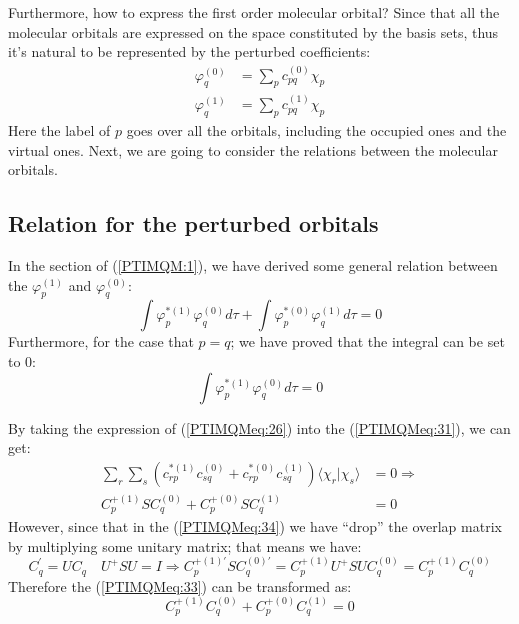 Furthermore, how to express the first order molecular orbital? Since
that all the molecular orbitals are expressed on the space
constituted by the basis sets, thus it's natural to be represented
by the perturbed coefficients:
\begin{align}\label{PTIMQMeq:26}
\varphi^{(0)}_{q} &= \sum_{p}c^{(0)}_{pq}\chi_{p} \nonumber \\
\varphi^{(1)}_{q} &= \sum_{p}c^{(1)}_{pq}\chi_{p}
\end{align}
Here the label of $p$ goes over all the orbitals, including the
occupied ones and the virtual ones. Next, we are going to consider
the relations between the molecular orbitals.



\subsection{Relation for the perturbed orbitals}
%
%
%
In the section of (\ref{PTIMQM:1}), we have derived some general
relation between the $\varphi^{(1)}_{p}$ and $\varphi^{(0)}_{q}$:
\begin{equation}\label{PTIMQMeq:31}
\int\varphi^{*(1)}_{p}\varphi^{(0)}_{q}d\tau
+\int\varphi^{*(0)}_{p}\varphi^{(1)}_{q}d\tau = 0
\end{equation}
Furthermore, for the case that $p=q$; we have proved that the
integral can be set to $0$:
\begin{equation}\label{}
\int\varphi^{*(1)}_{p}\varphi^{(0)}_{q}d\tau = 0
\end{equation}

By taking the expression of (\ref{PTIMQMeq:26}) into the
(\ref{PTIMQMeq:31}), we can get:
\begin{align}\label{PTIMQMeq:33}
\sum_{r}\sum_{s}(c^{*(1)}_{rp}c^{(0)}_{sq} +
c^{*(0)}_{rp}c^{(1)}_{sq})\langle\chi_{r}|\chi_{s}\rangle &= 0
\Rightarrow\nonumber \\
C^{+(1)}_{p}SC^{(0)}_{q} + C^{+(0)}_{p}SC^{(1)}_{q} &= 0
\end{align}
However, since that in the (\ref{PTIMQMeq:34}) we have ``drop'' the
overlap matrix by multiplying some unitary matrix; that means we
have:
\begin{equation}\label{}
C^{'}_{q} = UC_{q} \quad U^{+}SU = I \Rightarrow
C^{+(1)'}_{p}SC^{(0)'}_{q} = C^{+(1)}_{p}U^{+}SUC^{(0)}_{q} =
C^{+(1)}_{p}C^{(0)}_{q}
\end{equation}
Therefore the (\ref{PTIMQMeq:33}) can be transformed as:
\begin{equation}\label{PTIMQMeq:35}
C^{+(1)}_{p}C^{(0)}_{q} + C^{+(0)}_{p}C^{(1)}_{q} = 0
\end{equation}

